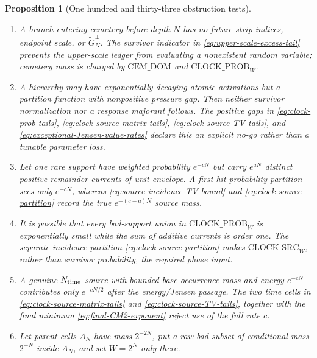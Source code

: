 \documentclass[11pt]{article}
\newtheorem{proposition}[theorem]{Proposition}
\begin{document}
\begin{proposition}[One hundred and thirty-three obstruction tests]
\begin{enumerate}[label=\textup{(T\arabic*)}]
      $\mathbb E[\mathcal C_i^{q_C}\mid\mathcal F_{\tau_i}]
      =\mathcal C_i^{q_C}$ and no uniform conditional bound exists.
      Equation \eqref{eq:complete-tree-cemetery-moment}, or the genuinely
      earlier kernel \eqref{eq:parent-kernel-cemetery-moment}, rejects this
      filtration tautology.
\item A branch entering cemetery before depth $N$ has no future strip indices,
      endpoint scale, or $\widetilde G_N^\pm$.  The survivor indicator in
      \eqref{eq:upper-scale-excess-tail} prevents the upper-scale ledger from
      evaluating a nonexistent random variable; cemetery mass is charged by
      $\mathrm{CEM\_DOM}$ and $\mathrm{CLOCK\_PROB}_{W}$.
\item A hierarchy may have exponentially decaying atomic activations but a
      partition function with nonpositive pressure gap.  Then neither
      survivor normalization nor a response majorant follows.  The positive
      gaps in \eqref{eq:clock-prob-tails},
      \eqref{eq:clock-source-matrix-tails},
      \eqref{eq:clock-source-TV-tails}, and
      \eqref{eq:exceptional-Jensen-value-rates} declare this an explicit
      no-go rather than a tunable parameter loss.
\item Let one rare support have weighted probability $e^{-cN}$ but carry
      $e^{aN}$ distinct positive remainder currents of unit envelope.  A
      first-hit probability partition sees only $e^{-cN}$, whereas
      \eqref{eq:source-incidence-TV-bound} and
      \eqref{eq:clock-source-partition} record the true
      $e^{-(c-a)N}$ source mass.
\item It is possible that every bad-support union in
      $\mathrm{CLOCK\_PROB}_{W}$ is exponentially small while the sum of
      additive currents is order one.  The separate incidence partition
      \eqref{eq:clock-source-partition} makes
      $\mathrm{CLOCK\_SRC}_{W}$, rather than survivor probability, the
      required phase input.
\item A genuine $N_{\rm time}$ source with bounded base occurrence mass and
      energy $e^{-cN}$ contributes only $e^{-cN/2}$ after the
      energy/Jensen passage.  The two time
      cells in \eqref{eq:clock-source-matrix-tails} and
      \eqref{eq:clock-source-TV-tails}, together with the final minimum
      \eqref{eq:final-CM2-exponent} reject use of the full rate $c$.
\item Let parent cells $A_N$ have mass $2^{-2N}$, put a raw bad subset of
      conditional mass $2^{-N}$ inside $A_N$, and set $W=2^N$ only there.

\end{enumerate}
\end{proposition}
\end{document}
